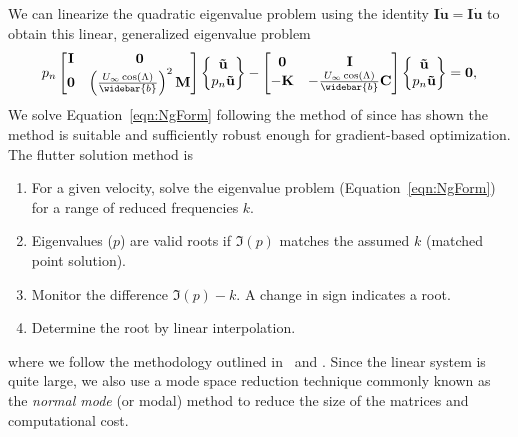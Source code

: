 \documentclass[10pt]{article}
\newcommand{\mbf}[1]{\mathbf{#1}}
\newcommand{\be}{\begin{eqnarray}}
\newcommand{\ee}{\end{eqnarray}}
\newcommand{\Uinf}{U_{\infty}}
\begin{document}
We can linearize the quadratic eigenvalue problem using the identity $\mbf{I}\dot{\mbf{u}} = \mbf{I}\dot{\mbf{u}}$ to obtain this linear, generalized eigenvalue problem
%
\be
\label{eqn:NgForm}
p_n
\begin{bmatrix}
    \mbf{I} & \mbf{0}                                                         \\
    \mbf{0} & \left( \frac{\Uinf\cos(\Lambda)}{\widebar{b}} \right)^2 \mbf{M}
\end{bmatrix}
\left\{
\begin{matrix}
    \mbf{\tilde{u}} \\
    p_n\mbf{\tilde{u}}
\end{matrix}
\right\}
-
\begin{bmatrix}
    \mbf{0}  & \mbf{I}                                         \\
    -\mbf{K} & - \frac{\Uinf\cos(\Lambda)}{\widebar{b}}\mbf{C}
\end{bmatrix}
\left\{
\begin{matrix}
    \mbf{\tilde{u}} \\
    p_n\mbf{\tilde{u}}
\end{matrix}
\right\}
=
\mbf{0},
\ee
We solve Equation~\eqref{eqn:NgForm} following the method of \citet{Zyl2001a} since \citet{Jonsson2020b} has shown the method is suitable and sufficiently robust enough for gradient-based optimization.
The flutter solution method is
\begin{enumerate}
    \item For a given velocity, solve the eigenvalue problem (Equation~\eqref{eqn:NgForm}) for a range of reduced frequencies $k$.
    \item Eigenvalues ($p$) are valid roots if $\Im(p)$ matches the assumed $k$ (matched point solution).
    \item Monitor the difference $\Im(p) - k$. A change in sign indicates a root.
    \item Determine the root by linear interpolation.
\end{enumerate}
where we follow the methodology outlined in~\citet{Jonsson2019a} and \citet[Ch. 3]{Jonsson2020b}.
Since the linear system is quite large, we also use a mode space reduction technique commonly known as the \emph{normal mode} (or modal) method to reduce the size of the matrices and computational cost.
\end{document}
